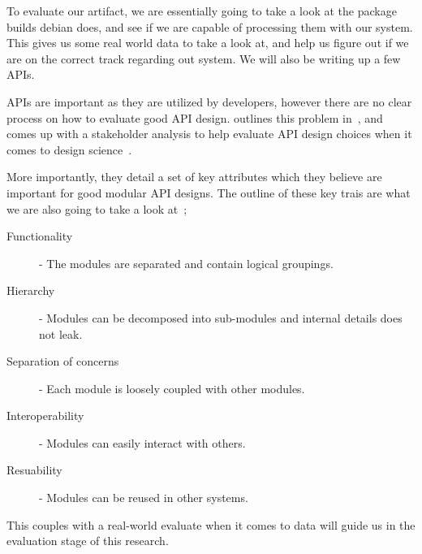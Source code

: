 \documentclass[../Main/thesis.tex]{subfiles}
\begin{document}
To evaluate our artifact, we are essentially going to take a look at the package
builds debian does, and see if we are capable of processing them with our
system. This gives us some real world data to take a look at, and help us figure
out if we are on the correct track regarding out system. We will also be writing
up a few APIs. 

APIs are important as they are utilized by developers, however there are no
clear process on how to evaluate good API design.
\citeauthor{Iyer:2012:EAC:2342209.2342213} outlines this problem
in~, and comes up with a stakeholder
analysis to help evaluate API design choices when it comes to design
science~\cite{Iyer:2012:EAC:2342209.2342213}.

More importantly, they detail a set of key attributes which they believe are
important for good modular API designs.  
The outline of these key trais are what we are also going to take a look at~\cite[p.~31]{Iyer:2012:EAC:2342209.2342213};
\begin{description}
    \item[Functionality] - The modules are separated and contain logical groupings.
    \item[Hierarchy] - Modules can be decomposed into sub-modules and internal details does not leak.
    \item[Separation of concerns] - Each module is loosely coupled with other modules.
    \item[Interoperability] - Modules can easily interact with others.
    \item[Resuability] - Modules can be reused in other systems.
\end{description}

This couples with a real-world evaluate when it comes to data will guide us in
the evaluation stage of this research.




\blankpage
\end{document}
